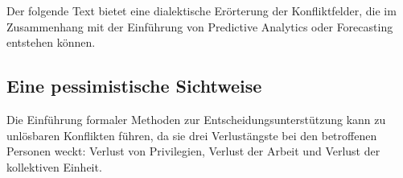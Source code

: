 

Der folgende Text bietet eine dialektische Erörterung der Konfliktfelder, die im
Zusammenhang mit der Einführung von Predictive Analytics oder Forecasting entstehen
können.


\subsection{Eine pessimistische Sichtweise}

Die Einführung formaler Methoden zur Entscheidungsunterstützung kann zu unlösbaren Konflikten führen,
da sie drei Verlustängste bei den betroffenen Personen weckt: Verlust von Privilegien,
Verlust der Arbeit und Verlust der kollektiven Einheit. 

